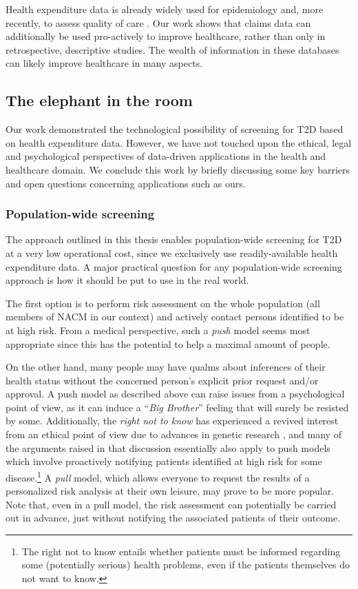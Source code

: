 Health expenditure data is already widely used for epidemiology \citep{pladevall2004clinical,lee2006medication,garg2010acute,s23} and, more recently, to assess quality of care \citep{kcequality}. Our work shows that claims data can additionally be used pro-actively to improve healthcare, rather than only in retrospective, descriptive studies. The wealth of information in these databases can likely improve healthcare in many aspects.


\subsection{The elephant in the room}
Our work demonstrated the technological possibility of screening for T2D based on health expenditure data. However, we have not touched upon the ethical, legal and psychological perspectives of data-driven applications in the health and healthcare domain. We conclude this work by briefly discussing some key barriers and open questions concerning applications such as ours.

\subsubsection{Population-wide screening}

The approach outlined in this thesis enables population-wide screening for T2D at a very low operational cost, since we exclusively use readily-available health expenditure data. A major practical question for any population-wide screening approach is how it should be put to use in the real world. 

The first option is to perform risk assessment on the whole population (all members of NACM in our context) and actively contact persons identified to be at high risk. From a medical perspective, such a \emph{push} model seems most appropriate since this has the potential to help a maximal amount of people. 

On the other hand, many people may have qualms about inferences of their health status without the concerned person's explicit prior request and/or approval. A push model as described above can raise issues from a psychological point of view, as it can induce a ``\emph{Big Brother}'' feeling that will surely be resisted by some. Additionally, the \emph{right not to know} has experienced a revived interest from an ethical point of view due to advances in genetic research \citep{ost1984right, andorno2004right, chadwick2014right}, and many of the arguments raised in that discussion essentially also apply to push models which involve proactively notifying patients identified at high risk for some disease.\footnote{The right not to know entails whether patients must be informed regarding some (potentially serious) health problems, even if the patients themselves do not want to know.} A \emph{pull} model, which allows everyone to request the results of a personalized risk analysis at their own leisure, may prove to be more popular. Note that, even in a pull model, the risk assessment can potentially be carried out in advance, just without notifying the associated patients of their outcome.

